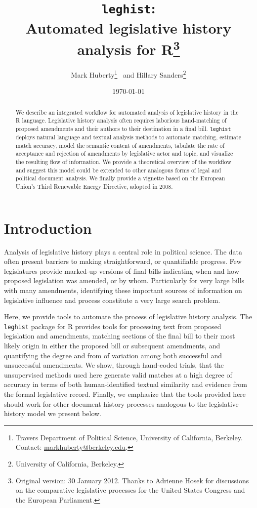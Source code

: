\documentclass[11pt]{article}
\title{\texttt{leghist}:\\ Automated legislative history analysis for
  R\thanks{Original version: 30 January 2012. Thanks to Adrienne Hosek for discussions on the
  comparative legislative processes for the United States Congress and
the European Parliament.}}
\author{Mark Huberty\thanks{Travers Department of Political Science,
    University of California, Berkeley. Contact:
    \url{markhuberty@berkeley.edu}.}~ and Hillary Sanders\thanks{University of
California, Berkeley.}}
\date{\today}
\begin{document}
%
\maketitle

\begin{abstract}
  We describe an integrated workflow for automated analysis of
  legislative history in the R language. Legislative history analysis
  often requires laborious hand-matching of proposed amendments and
  their authors to their destination in a final bill. \texttt{leghist}
  deploys natural language and textual analysis methods to automate
  matching, estimate match accuracy, model the
  semantic content of amendments, tabulate the rate of acceptance and
  rejection of amendments by legislative actor and topic, and visualize the
  resulting flow of information. We provide a theoretical
  overview of the workflow and suggest this model could be extended to
  other analogous forms of legal and political document analysis. We
  finally provide a vignette based on the European Union's Third
  Renewable Energy Directive, adopted in 2008. 
\end{abstract}

\tableofcontents 
\section{Introduction}
\label{sec:introduction}

Analysis of legislative history plays a central role in political
science. The data often present barriers to making straightforward, or
quantifiable progress. Few legislatures provide marked-up versions of final bills
indicating when and how proposed legislation was amended, or by
whom. Particularly for very large bills with many amendments,
identifying these important sources of information on legislative
influence and process constitute a very large search problem. 

Here, we provide tools to automate the process of legislative history
analysis. The \texttt{leghist} package for R provides tools for
processing text from proposed legislation and amendments, matching
sections of the final bill to their most likely origin in either the
proposed bill or subsequent amendments, and quantifying the degree and
from of variation among both successful and unsuccessful
amendments. We show, through hand-coded trials, that the unsupervised
methods used here generate valid matches at a high degree of accuracy
in terms of both human-identified textual similarity and evidence from
the formal legislative record. Finally, we emphasize that the tools
provided here should work for other document history processes
analogous to the legislative history model we present below.
\end{document}
